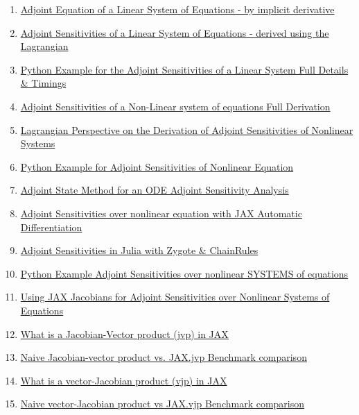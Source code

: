 \documentclass[11pt]{article}
\begin{document}
\begin{enumerate}
	\item  \href{https://mp.weixin.qq.com/s/zFCMeqcESJfZCJjfu92sjg}{Adjoint Equation of a Linear System of Equations - by implicit derivative} %
	\item  \href{https://mp.weixin.qq.com/s/b9yHy1WEKca1qda24E3aRw}{Adjoint Sensitivities of a Linear System of Equations - derived using the Lagrangian} %
	\item  \href{https://mp.weixin.qq.com/s/L1wNHylcA3h7Qm9Hx0lcxw}{Python Example for the Adjoint Sensitivities of a Linear System  Full Details \& Timings} %
	\item  \href{https://mp.weixin.qq.com/s/4OILR7Xf64M-rDkLNH4s5g}{Adjoint Sensitivities of a Non-Linear system of equations  Full Derivation} %
	\item  \href{https://mp.weixin.qq.com/s/HNPeePbm_ctDeGclViHi6g}{Lagrangian Perspective on the Derivation of Adjoint Sensitivities of Nonlinear Systems} %
	\item  \href{https://mp.weixin.qq.com/s/WtHAOIb27wdFaRImCLWUYw}{Python Example for Adjoint Sensitivities of Nonlinear Equation} %
	\item  \href{https://mp.weixin.qq.com/s/3okjGSJq5GDRC6cQscSDxw}{Adjoint State Method for an ODE  Adjoint Sensitivity Analysis} %
	\item  \href{https://mp.weixin.qq.com/s/b1QZQSVmr07hIXjNewDyYA}{Adjoint Sensitivities over nonlinear equation with JAX Automatic Differentiation} %
	\item  \href{https://mp.weixin.qq.com/s/CZBsfhYkLenCRGnMju0KRA}{Adjoint Sensitivities in Julia with Zygote \& ChainRules} %
	\item  \href{https://mp.weixin.qq.com/s/i_4D0CPukDh7f4x33VNgng}{Python Example Adjoint Sensitivities over nonlinear SYSTEMS of equations} %
	\item  \href{https://mp.weixin.qq.com/s/e5H0Z6RkdjjAk_Dq6Laqbw}{Using JAX Jacobians for Adjoint Sensitivities over Nonlinear Systems of Equations} %
	\item  \href{https://mp.weixin.qq.com/s/GTiBXck7mhtdXxv7k1XNQA}{What is a Jacobian-Vector product (jvp) in JAX} %
	\item  \href{https://mp.weixin.qq.com/s/K8HVYGsHW9sgkNcJDL0d8g}{Naive Jacobian-vector product vs. JAX.jvp  Benchmark comparison} %
	\item  \href{https://mp.weixin.qq.com/s/DOz5Uc9RsfcyfNwROYKHpg}{What is a vector-Jacobian product (vjp) in JAX} %
	\item  \href{https://mp.weixin.qq.com/s/dWnLDP7_iWhxnsEEfm0bZA}{Naive vector-Jacobian product vs JAX.vjp  Benchmark comparison} %

\end{enumerate}
\end{document}
